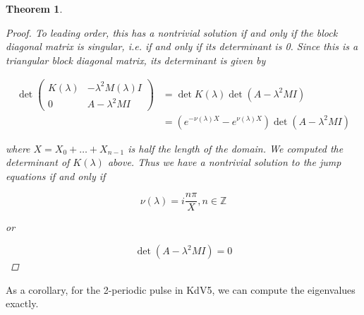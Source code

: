 \documentclass[12pt]{article}
\def\Z{{\mathbb Z}}
\newtheorem{theorem}{Theorem}
\begin{document}
\begin{theorem}
\begin{proof}
To leading order, this has a nontrivial solution if and only if the block diagonal matrix is singular, i.e. if and only if its determinant is 0. Since this is a triangular block diagonal matrix, its determinant is given by 

\begin{align*}
\det \begin{pmatrix}
K(\lambda) & -\lambda^2 M(\lambda) I \\
0 & A - \lambda^2 MI
\end{pmatrix} &= \det K(\lambda) \det(A - \lambda^2 MI)\\
&= ( e^{-\nu(\lambda) X} - e^{\nu(\lambda) X} ) \det(A - \lambda^2 MI)
\end{align*}

where $X = X_0 + \dots + X_{n-1}$ is half the length of the domain. We computed the determinant of $K(\lambda)$ above. Thus we have a nontrivial solution to the jump equations if and only if 

\[
\nu(\lambda) = i \frac{n \pi}{X}, n \in \Z
\]

or 

\[
\det(A - \lambda^2 MI) = 0
\]

\end{proof}
\end{theorem}

As a corollary, for the 2-periodic pulse in KdV5, we can compute the eigenvalues exactly.

\end{document}
